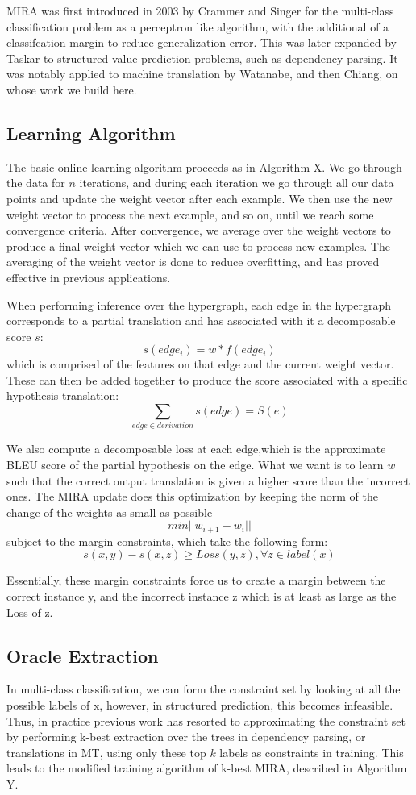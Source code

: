 MIRA was first introduced in 2003 by Crammer and Singer for the multi-class classification problem as a perceptron like algorithm, with the additional of a classifcation margin to reduce generalization error. This was later expanded by Taskar to structured value prediction problems, such as dependency parsing. It was notably applied to machine translation by Watanabe, and then Chiang, on whose work we build here.

\subsection{Learning Algorithm}
The basic online learning algorithm proceeds as in Algorithm X. We go through the data for $n$ iterations, and during each iteration we go through all our data points and update the weight vector after each example. We then use the new weight vector to process the next example, and so on, until we reach some convergence criteria. After convergence, we average over the weight vectors to produce a final weight vector which we can use to process new examples. The averaging of the weight vector is done to reduce overfitting, and has proved effective in previous applications. 

When performing inference over the hypergraph, each edge in the hypergraph corresponds to a partial translation and has associated with it a decomposable score $s$:
$$s(edge_i) = w*f(edge_i)$$
which is comprised of the features on that edge and the current weight vector. These can then be added together to produce the score associated with a specific hypothesis translation:
$$\sum_{edge \in derivation} s(edge)= S(e) $$

We also compute a decomposable loss at each edge,which is the approximate BLEU score of the partial hypothesis on the edge. 
What we want is to learn $w$ such that the correct output translation is given a higher score than the incorrect ones. The MIRA update does this optimization by keeping the norm of the change of the weights as small as possible
$$ min ||w_{i+1} - w_i||$$
subject to the margin constraints, which take the following form:
$$ s(x,y) - s(x,z) \geq Loss(y,z), \forall{z} \in label(x)$$

Essentially, these margin constraints force us to create a margin between the correct instance y, and the incorrect instance z which is at least as large as the Loss of z.




\subsection{Oracle Extraction}
In multi-class classification, we can form the constraint set by looking at all the possible labels of x, however, in structured prediction, this becomes infeasible. Thus, in practice previous work has resorted to approximating the constraint set by performing k-best extraction over the trees in dependency parsing, or translations in MT, using only these top $k$ labels as constraints in training. This leads to the modified training algorithm of k-best MIRA, described in Algorithm Y. 


